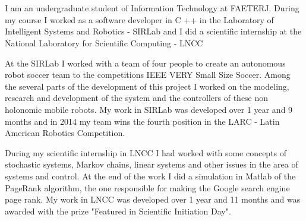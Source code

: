 \documentclass[a4paper]{report} %
\begin{document}
\section*{}
\vspace{-1.3cm}
\subsection*{}

\vspace{1cm}

I am an undergraduate student of Information Technology at FAETERJ. During my course I worked as a software developer in C ++ in the Laboratory of Intelligent Systems and Robotics - SIRLab and I did a scientific internship at the National Laboratory for Scientific Computing - LNCC

At the SIRLab I worked with a team of four people to create an autonomous robot soccer team to the competitions IEEE VERY Small Size Soccer. Among the several parts of the development of this project I worked on the modeling, research and development of the system and the controllers of these non holonomic mobile robots. My work in SIRLab was developed over 1 year and 9 months and in 2014 my team wins the fourth position in the LARC - Latin American Robotics Competition.

During my scientific internship in LNCC I had worked with some concepts of stochastic systems, Markov chains, linear systems and other issues in the area of systems and control. At the end of the work I did a simulation in Matlab of the PageRank algorithm, the one responsible for making the Google search engine page rank. My work in LNCC was developed over 1 year and 11 months and was awarded with the prize "Featured in Scientific Initiation Day".

\end{document}

